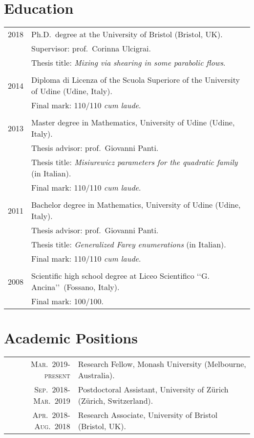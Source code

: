 \documentclass[a4paper,10pt]{article}
\begin{document}
\section{Education}
\begin{longtable}{r|p{11cm}}
 \textsc{2018} & Ph.D.~degree at the University of Bristol (Bristol, UK). \\
& Supervisor: prof.~Corinna Ulcigrai. \\ 
& Thesis title: \emph{Mixing via shearing in some parabolic flows}. \\
%
\multicolumn{2}{c}{} \\
%
\textsc{2014} & Diploma di Licenza of the Scuola Superiore of the University of Udine (Udine, Italy). \\ 
& Final mark: 110/110 \emph{cum laude}. \\
%
\multicolumn{2}{c}{} \\
%
\textsc{2013} & Master degree in Mathematics, University of Udine (Udine, Italy). \\
& Thesis advisor: prof.~Giovanni Panti. \\
& Thesis title: \emph{Misiurewicz parameters for the quadratic family} (in Italian). \\
& Final mark: 110/110 \emph{cum laude}. \\
%
\multicolumn{2}{c}{} \\
%
\textsc{2011} & Bachelor degree in Mathematics, University of Udine (Udine, Italy). \\
& Thesis advisor: prof.~Giovanni Panti. \\
& Thesis title: \emph{Generalized Farey enumerations} (in Italian). \\
& Final mark: 110/110 \emph{cum laude}. \\
%
\multicolumn{2}{c}{} \\
%
\textsc{2008} & Scientific high school degree at Liceo Scientifico \lq\lq G. Ancina\rq\rq\ (Fossano, Italy).\\
& Final mark: 100/100.
\end{longtable}


\section{Academic Positions}
\begin{longtable}{rl}	
 \textsc{Mar.~2019-present} & Research Fellow, Monash University (Melbourne, Australia). \\
%
\textsc{Sep.~2018-Mar.~2019} & Postdoctoral Assistant, University of Z\"{u}rich (Z\"{u}rich, Switzerland). \\ 
%
\textsc{Apr.~2018-Aug.~2018} & Research Associate, University of Bristol (Bristol, UK).
\end{longtable}
\end{document}
